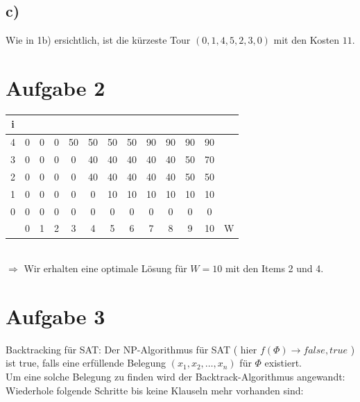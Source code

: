 \documentclass[a4paper,11pt,twoside]{article}
\begin{document}
\subsection*{c)}
Wie in 1b) ersichtlich, ist die kürzeste Tour $(0,1,4,5,2,3,0)$ mit den Kosten $11$.
\section*{Aufgabe 2}
\begin{tabular}{|c|c|c|c|c|c|c|c|c|c|c|c|c|}
	\hline i &  &  &  &  &  &  &  &  &  &  &  &  \\ 
	\hline 4 & 0 & 0 & 0 & 50 & 50 & 50 & 50 & 90 & 90 & 90 & 90 &  \\ 
	\hline 3 & 0 & 0 & 0 & 0 & 40 & 40 & 40 & 40 & 40 & 50 & 70 &  \\ 
	\hline 2 & 0 & 0 & 0 & 0 & 40 & 40 & 40 & 40 & 40 & 50 & 50 &  \\ 
	\hline 1 & 0 & 0 & 0 & 0 & 0 & 10 & 10 & 10 & 10 & 10 & 10 &  \\ 
	\hline 0 & 0 & 0 & 0 & 0 & 0 & 0 & 0 & 0 & 0 & 0 & 0 &  \\ 
	\hline  & 0 & 1 & 2 & 3 & 4 & 5 & 6 & 7 & 8 & 9 & 10 & W \\ 
	\hline 
	\end{tabular} \\$\Rightarrow$ Wir erhalten eine optimale Lösung für $W=10$ mit den Items 2 und 4.
\section*{Aufgabe 3}


Backtracking für SAT:
Der NP-Algorithmus für SAT ( hier $f(\Phi) \rightarrow {false, true}$ ) ist true, falls eine erfüllende Belegung $(x_1, x_2, \ldots, x_n)$ für $\Phi$ existiert.\\
Um eine solche Belegung zu finden wird der Backtrack-Algorithmus angewandt:\\

Wiederhole folgende Schritte bis keine Klauseln mehr vorhanden sind:\\
\end{document}
